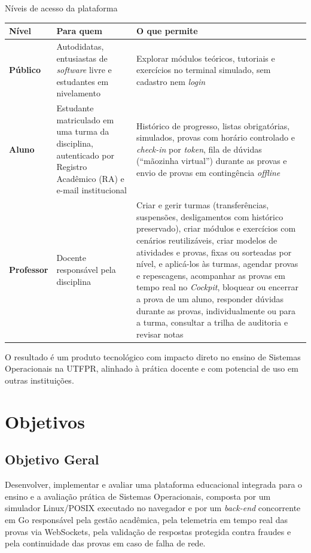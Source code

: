 \begin{quadro}[htbp]
    \caption{Níveis de acesso da plataforma}
    \label{qua:niveis-acesso}
    \footnotesize
    \begin{tabularx}{\textwidth}{|p{2.6cm}|L|L|}
        \hline
        \textbf{Nível} & \textbf{Para quem} & \textbf{O que permite} \\
        \hline
        \textbf{Público} & Autodidatas, entusiastas de \textit{software} livre e estudantes em nivelamento & Explorar módulos teóricos, tutoriais e exercícios no terminal simulado, sem cadastro nem \textit{login} \\
        \hline
        \textbf{Aluno} & Estudante matriculado em uma turma da disciplina, autenticado por Registro Acadêmico (RA) e e-mail institucional & Histórico de progresso, listas obrigatórias, simulados, provas com horário controlado e \textit{check-in} por \textit{token}, fila de dúvidas (``mãozinha virtual'') durante as provas e envio de provas em contingência \textit{offline} \\
        \hline
        \textbf{Professor} & Docente responsável pela disciplina & Criar e gerir turmas (transferências, suspensões, desligamentos com histórico preservado), criar módulos e exercícios com cenários reutilizáveis, criar modelos de atividades e provas, fixas ou sorteadas por nível, e aplicá-los às turmas, agendar provas e repescagens, acompanhar as provas em tempo real no \textit{Cockpit}, bloquear ou encerrar a prova de um aluno, responder dúvidas durante as provas, individualmente ou para a turma, consultar a trilha de auditoria e revisar notas \\
        \hline
    \end{tabularx}
\end{quadro}

O resultado é um produto tecnológico com impacto direto no ensino de Sistemas Operacionais na UTFPR, alinhado à prática docente e com potencial de uso em outras instituições.

\section{Objetivos}
\label{sec:objetivos}

\subsection{Objetivo Geral}
Desenvolver, implementar e avaliar uma plataforma educacional integrada para o ensino e a avaliação prática de Sistemas Operacionais, composta por um simulador Linux/POSIX executado no navegador e por um \textit{back-end} concorrente em Go responsável pela gestão acadêmica, pela telemetria em tempo real das provas via WebSockets, pela validação de respostas protegida contra fraudes e pela continuidade das provas em caso de falha de rede.

